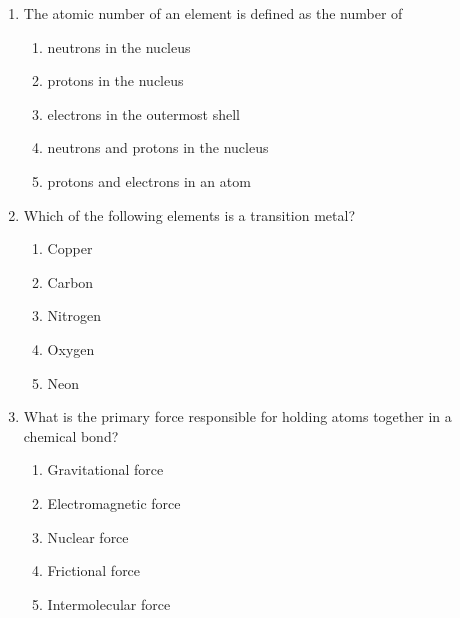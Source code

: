 \documentclass[12pt]{article}
\newenvironment{questionblock}[1][10]{
    \par\Needspace{#1\baselineskip}
}{
    \par
}
\begin{document}
\begin{enumerate}
\begin{enumerate}[label=(\roman*)]
    \begin{questionblock}
      \item The atomic number of an element is defined as the number of
      \begin{enumerate}[label=\Alph*.]
        \item neutrons in the nucleus
        \item protons in the nucleus
        \item electrons in the outermost shell
        \item neutrons and protons in the nucleus
        \item protons and electrons in an atom
      \end{enumerate}
      \vspace{0.8em}
    \end{questionblock}

    \begin{questionblock}
      \item Which of the following elements is a transition metal?
      \begin{enumerate}[label=\Alph*.]
        \item Copper
        \item Carbon
        \item Nitrogen
        \item Oxygen
        \item Neon
      \end{enumerate}
      \vspace{0.8em}
    \end{questionblock}

    \begin{questionblock}
      \item What is the primary force responsible for holding atoms together in a chemical bond?
      \begin{enumerate}[label=\Alph*.]
        \item Gravitational force
        \item Electromagnetic force
        \item Nuclear force
        \item Frictional force
        \item Intermolecular force
      \end{enumerate}
      \vspace{0.8em}
    \end{questionblock}


\end{enumerate}
\end{enumerate}
\end{document}
